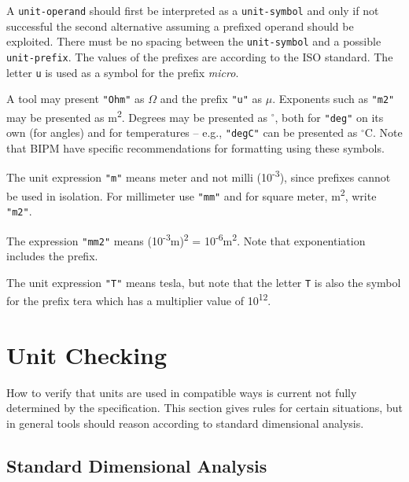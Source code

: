 A \lstinline[language=grammar]!unit-operand! should first be interpreted as a \lstinline[language=grammar]!unit-symbol! and only if not successful the second alternative assuming a prefixed operand should be exploited.
There must be no spacing between the \lstinline[language=grammar]!unit-symbol! and a possible \lstinline[language=grammar]!unit-prefix!.
The values of the prefixes are according to the ISO standard.
The letter \lstinline!u! is used as a symbol for the prefix \emph{micro}.

\begin{nonnormative}
A tool may present \lstinline!"Ohm"! as $\Omega$ and the prefix \lstinline!"u"! as $\mu$.
Exponents such as \lstinline!"m2"! may be presented as m\textsuperscript{2}.
Degrees may be presented as $^{\circ}$, both for \lstinline!"deg"! on its own (for angles) and for temperatures -- e.g., \lstinline!"degC"! can be presented as $^{\circ}$C.
Note that BIPM have specific recommendations for formatting using these symbols.
\end{nonnormative}

\begin{example}
The unit expression \lstinline!"m"! means meter and not milli (10\textsuperscript{-3}), since prefixes cannot be used in isolation.
For millimeter use \lstinline!"mm"! and for square meter, m\textsuperscript{2}, write \lstinline!"m2"!.

The expression \lstinline!"mm2"! means (10\textsuperscript{-3}m)\textsuperscript{2} = 10\textsuperscript{-6}m\textsuperscript{2}.
Note that exponentiation includes the prefix.

The unit expression \lstinline!"T"! means tesla, but note that the letter \lstinline!T! is also the symbol for the prefix tera which has a multiplier value of 10\textsuperscript{12}.
\end{example}


\section{Unit Checking}\label{unit-checking}

How to verify that units are used in compatible ways is current not fully determined by the specification.
This section gives rules for certain situations, but in general tools should reason according to standard dimensional analysis.


\subsection{Standard Dimensional Analysis}\label{standard-dimensional-analysis}


